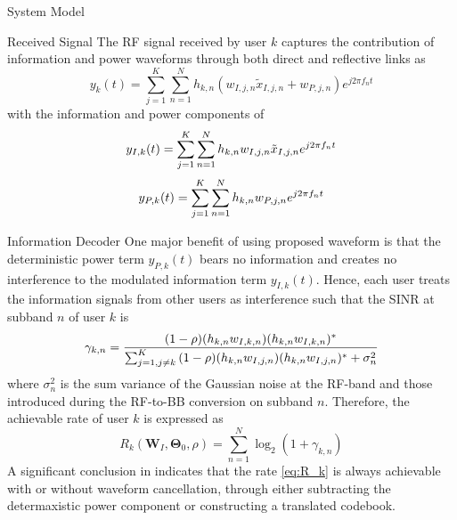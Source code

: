 \documentclass{IEEEtran}
\begin{document}
\begin{section}{System Model}
	\begin{subsection}{Received Signal}
		The RF signal received by user $k$ captures the contribution of information and power waveforms through both direct and reflective links as
		\begin{equation}\label{eq:y_k(t)}
			y_k(t)=\sum_{j=1}^K\sum_{n=1}^N{h_{k,n}}(w_{I,j,n}\tilde{x}_{I,j,n}+w_{P,j,n}){e^{j2{\pi}{f_n}{t}}}
		\end{equation}
		with the information and power components of
		\begin{equation}\label{eq:y_{I,k}(t)}
			y_{I,k}(t)=\sum_{j=1}^K\sum_{n=1}^N{h_{k,n}w_{I,j,n}\tilde{x}_{I,j,n}}{e^{j2{\pi}{f_n}{t}}}
		\end{equation}
		\begin{equation}\label{eq:y_{P,k}(t)}
			y_{P,k}(t)=\sum_{j=1}^K\sum_{n=1}^N{h_{k,n}w_{P,j,n}}{e^{j2{\pi}{f_n}{t}}}
		\end{equation}

	\end{subsection}

	\begin{subsection}{Information Decoder}
		One major benefit of using proposed waveform is that the deterministic power term $y_{P,k}(t)$ bears no information and creates no interference to the modulated information term $y_{I,k}(t)$. Hence, each user treats the information signals from other users as interference such that the SINR at subband $n$ of user $k$ is
		\begin{equation}\label{eq:gamma_{k,n}}
			\gamma_{k,n}=\frac{(1-\rho)(h_{k,n}w_{I,k,n})(h_{k,n}w_{I,k,n})^*}{\sum_{j=1,j{\ne}k}^K{(1-\rho)(h_{k,n}w_{I,j,n})(h_{k,n}w_{I,j,n})^*+\sigma_n^2}}
		\end{equation}
		where $\sigma_n^2$ is the sum variance of the Gaussian noise at the RF-band and those introduced during the RF-to-BB conversion on subband $n$. Therefore, the achievable rate of user $k$ is expressed as
		\begin{equation}\label{eq:R_k}
			R_k(\boldsymbol{W}_I,\boldsymbol{\Theta}_0,\rho)=\sum_{n=1}^N{\log_2(1+\gamma_{k,n})}
		\end{equation}
		A significant conclusion in \cite{Clerckx2018b} indicates that the rate \ref{eq:R_k} is always achievable with or without waveform cancellation, through either subtracting the determaxistic power component or constructing a translated codebook.
	\end{subsection}


\end{section}
\end{document}
